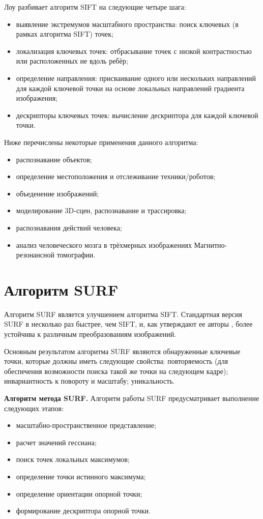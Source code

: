 Лоу разбивает алгоритм SIFT на следующие четыре шага:

\begin{itemize}
	\item выявление экстремумов масштабного пространства: поиск ключевых (в рамках алгоритма SIFT) точек;
	\item локализация ключевых точек: отбрасывание точек с низкой контрастностью или расположенных не вдоль ребёр;
	\item определение направления: присваивание одного или нескольких направлений для каждой ключевой точки на основе локальных направлений градиента изображения;
	\item дескрипторы ключевых точек: вычисление дескриптора для каждой ключевой точки.
\end{itemize}

Ниже перечислены некоторые применения данного алгоритма:

\begin{itemize}
	\item распознавание объектов;
	\item определение местоположения и отслеживание техники/роботов;
	\item объеденение изображений;
	\item моделирование 3D-сцен, распознавание и трассировка;
	\item распознавания действий человека;
	\item анализ человеческого мозга в трёхмерных изображениях Магнитно-резонансной томографии.
\end{itemize}

\section{Алгоритм SURF}
Алгоритм SURF является улучшением алгоритма SIFT. Стандартная версия SURF в несколько раз быстрее, чем SIFT, и, как утверждают ее авторы \cite{SURF}, более устойчива к различным преобразованиям изображений.

Основным результатом алгоритма SURF являются обнаруженные ключевые точки, которые должны иметь следующие свойства: повторяемость (для
обеспечения возможности поиска такой же точки на следующем кадре); инвариантность к повороту и масштабу; уникальность.

\textbf{Алгоритм метода SURF.} Алгоритм работы SURF предусматривает выполнение следующих этапов:

\begin{itemize}
	\item масштабно-пространственное представление;
	\item расчет значений гессиана;
	\item поиск точек локальных максимумов;
	\item определение точки истинного максимума;
	\item определение ориентации опорной точки;
	\item формирование дескриптора опорной точки.
\end{itemize}

